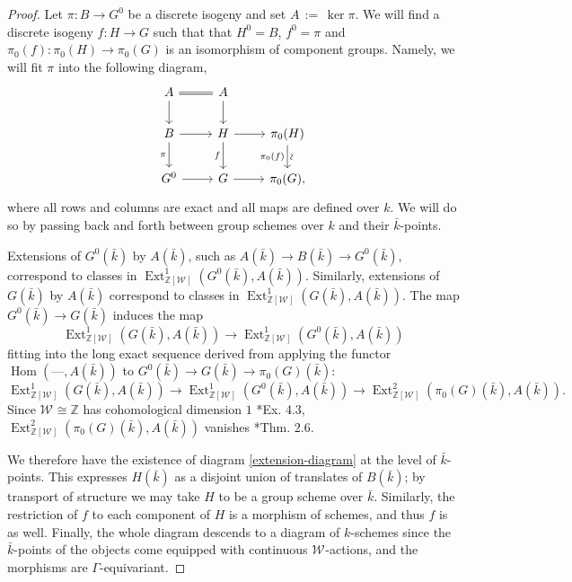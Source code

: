\documentclass[11pt]{amsart}
\theoremstyle{plain}
\theoremstyle{definition}
\theoremstyle{remark}
\newcommand{\ZZ}{{\mathbb{Z}}}
\newcommand{\bFq}{\bar{k}}
\newcommand{\Fq}{k}
\DeclareMathOperator{\Hom}{Hom}
\DeclareMathOperator{\Ext}{Ext}
\newcommand{\ceq}{{\, :=\, }}
\newcommand{\Weil}[1]{\mathcal{W}_{#1}}
\newcommand\Clifton[1]{\marginpar{\smaller\smaller CC: #1}}
\begin{document}
\begin{proof}
Let $\pi: B \to G^0$ be a discrete isogeny and set $A \ceq \ker \pi$.
  We will find a discrete isogeny $f: H\to G$
  such that that $H^0 = B$, $f^0 =\pi$ and
  $\pi_0(f) : \pi_0(H)\to \pi_0(G)$ is an isomorphism of component
  groups.  Namely, we will fit $\pi$ into the following diagram,
  \begin{equation}\label{extension-diagram}
  \begin{tikzcd}
  A \arrow[equal]{r} \dar & A \dar \\
  B \rar \dar[swap]{\pi} & H \rar \dar[swap]{f} & \pi_0(H) \arrow{d}[below,rotate=90]{\sim}[swap]{\pi_0(f)} \\
  G^0 \rar & G \rar & \pi_0(G),
  \end{tikzcd}
  \end{equation}
  where all rows and columns are exact and all maps are defined over
  $\Fq$.  We will do so by passing back and forth between group
  schemes over $\Fq$ and their $\bFq$-points.  
  
  Extensions of $G^0(\bFq)$ by $A(\bFq)$, such as $A(\bFq) \to B(\bFq) \to G^0(\bFq)$,
  correspond to classes in $\Ext^1_{\ZZ[\Weil{}]}(G^0(\bFq), A(\bFq))$.
  Similarly, extensions of $G(\bFq)$ by $A(\bFq)$ correspond to
  classes in $\Ext^1_{\ZZ[\Weil{}]}(G(\bFq), A(\bFq))$.  The map
  $G^0(\bFq) \to G(\bFq)$ induces the map
  \[
  \Ext^1_{\ZZ[\Weil{}]}(G(\bFq), A(\bFq)) \to \Ext^1_{\ZZ[\Weil{}]}(G^0(\bFq), A(\bFq))
  \]
  fitting into the long exact sequence derived from applying
  the functor $\Hom(\mbox{---}, A(\bFq))$ to $G^0(\bFq) \to G(\bFq) \to \pi_0(G)(\bFq)$:
  \[
  \Ext^1_{\ZZ[\Weil{}]}(G(\bFq), A(\bFq)) \to \Ext^1_{\ZZ[\Weil{}]}(G^0(\bFq), A(\bFq)) \to \Ext^2_{\ZZ[\Weil{}]}(\pi_0(G)(\bFq), A(\bFq)).
  \]
  Since $\Weil{} \cong \ZZ$ has cohomological dimension $1$ \cite{brown:CohomologyGrps}*{Ex. 4.3},
  $\Ext^2_{\ZZ[\Weil{}]}(\pi_0(G)(\bFq), A(\bFq))$ vanishes \cite{cartan-eilenberg:HomologicalAlgebra}*{Thm. 2.6}.

  We therefore have the existence of diagram \eqref{extension-diagram}
  at the level of $\bFq$-points.  This expresses $H(\bFq)$ as a
  disjoint union of translates of $B(\bFq)$; by transport of structure
  we may take $H$ to be a group scheme over $\bFq$.  Similarly, the
  restriction of $f$ to each component of $H$ is a morphism of
  schemes, and thus $f$ is as well.  Finally, the whole diagram
  descends to a diagram of $\Fq$-schemes since the $\bFq$-points of
  the objects come equipped with \Clifton{?} continuous $\Weil{}$-actions, and the
  morphisms are $\Gamma$-equivariant.
\end{proof}
\end{document}
